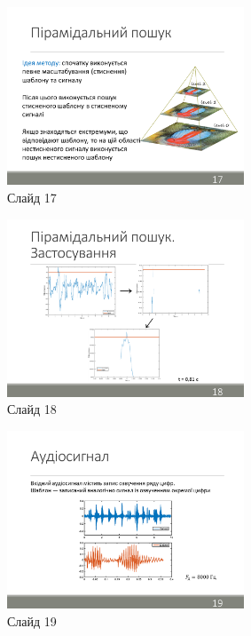 \documentclass[pdftex]{thesis_utf8}
\begin{document}
\begin{figure}[h]
    \centering
    \includegraphics[width=0.63\textwidth]{slides/slide17.png}
    \caption{Слайд 17}
\end{figure}

\begin{figure}[h]
    \centering
    \includegraphics[width=0.63\textwidth]{slides/slide18.png}
    \caption{Слайд 18}
\end{figure}
\clearpage

\begin{figure}[h]
    \centering
    \includegraphics[width=0.63\textwidth]{slides/slide19.png}
    \caption{Слайд 19}
\end{figure}
\end{document}
